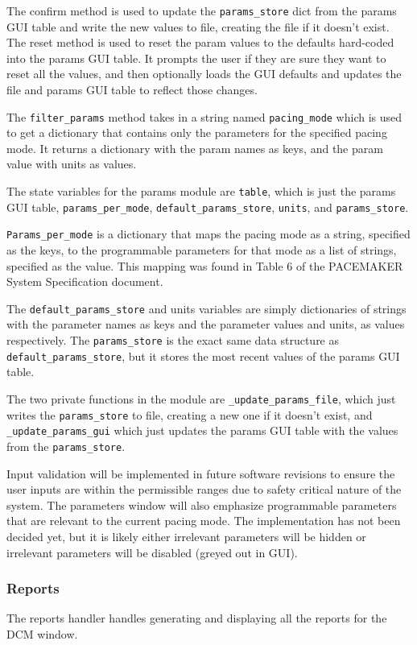 \documentclass[12pt]{article}
\begin{document}
The confirm method is used to update the \verb|params_store| dict from the params GUI table and write the new values to file, creating the file if it doesn't exist. The reset method is used to reset the param values to the defaults hard-coded into the params GUI table. It prompts the user if they are sure they want to reset all the values, and then optionally loads the GUI defaults and updates the file and params GUI table to reflect those changes.

The \verb|filter_params| method takes in a string named \verb|pacing_mode| which is used to get a dictionary that contains only the parameters for the specified pacing mode. It returns a dictionary with the param names as keys, and the param value with units as values.

The state variables for the params module are \verb|table|, which is just the params GUI table, \verb|params_per_mode|, \verb|default_params_store|, \verb|units|, and \verb|params_store|.

\verb|Params_per_mode| is a dictionary that maps the pacing mode as a string, specified as the keys, to the programmable parameters for that mode as a list of strings, specified as the value. This mapping was found in Table 6 of the PACEMAKER System Specification document.

The \verb|default_params_store| and units variables are simply dictionaries of strings with the parameter names as keys and the parameter values and units, as values respectively. The \verb|params_store| is the exact same data structure as \verb|default_params_store|, but it stores the most recent values of the params GUI table.

The two private functions in the module are \verb|_update_params_file|, which just writes the \verb|params_store| to file, creating a new one if it doesn't exist, and \verb|_update_params_gui| which just updates the params GUI table with the values from the \verb|params_store|.

Input validation will be implemented in future software revisions to ensure the user inputs are within the permissible ranges due to safety critical nature of the system. The parameters window will also emphasize programmable parameters that are relevant to the current pacing mode. The implementation has not been decided yet, but it is likely either irrelevant parameters will be hidden or irrelevant parameters will be disabled (greyed out in GUI).

\subsubsection{Reports}
The reports handler handles generating and displaying all the reports for the DCM window.
\end{document}
